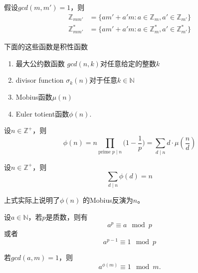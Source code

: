 \begin{theorem}
	假设$gcd(m, m')=1$，则
	\begin{equation*}
		\begin{split}
			\mathbb{Z}_{mm'} &= \{am'+a'm:a\in\mathbb{Z}_m,a'\in\mathbb{Z}_{m'}\}\\
			\mathbb{Z}_{mm'}^* &= \{am'+a'm:a\in\mathbb{Z}_m^*,a'\in\mathbb{Z}_{m'}^*\}
		\end{split}
	\end{equation*}
\end{theorem}
\begin{proposition}
	下面的这些函数是积性函数
	\begin{enumerate}
		\item 最大公约数函数 $gcd(n, k)$对任意给定的整数$k$
		\item divisor function $\sigma_k(n)$对于任意$k\in\mathbb{N}$
		\item Mobius函数$\mu(n)$
		\item Euler totient函数$\phi(n)$.
	\end{enumerate}
\end{proposition}
\begin{theorem}
	设$n\in \mathbb{Z}^+$，则
	\begin{equation*}
		\phi(n) = n\prod\limits_{\text{prime }p\mid n}\big(1-\frac{1}{p}\big) = \sum\limits_{d\mid n}d\cdot \mu(\frac{n}{d})
	\end{equation*}
\end{theorem}
\begin{theorem}
	设$n\in \mathbb{Z}^+$，则
	\begin{equation*}
		\sum\limits_{d\mid n}\phi(d) = n
	\end{equation*}
\end{theorem}
\begin{note}
	上式实际上说明了$\phi(n)$	的Mobius反演为$n$。
\end{note}
\begin{theorem}[Fermat小定理]
	设$a\in \mathbb{N}$，若$p$是质数，则有
	\begin{equation*}
		a^p \equiv a\mod p
	\end{equation*}
	或者
	\begin{equation*}
		a^{p-1}\equiv 1\mod p
	\end{equation*}
\end{theorem}
\begin{theorem}
	若$gcd(a, m) = 1$，则
	\begin{equation*}
		a^{\phi(m)} \equiv 1\mod m.
	\end{equation*}
\end{theorem}
